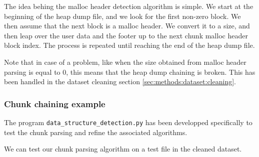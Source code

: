    The idea behing the malloc header detection algorithm is simple. We start at the beginning of the heap dump file, and we look for the first non-zero block. We then assume that the next block is a malloc header. We convert it to a size, and then leap over the user data and the footer up to the next chunk malloc header block index. The process is repeated until reaching the end of the heap dump file.

    Note that in case of a problem, like when the size obtained from malloc header parsing is equal to 0, this means that the heap dump chaining is broken. This has been handled in the dataset cleaning section \ref{sec:methods:dataset:cleaning}. 

    \subsubsection{Chunk chaining example}
    The program \texttt{data\_structure\_detection.py} has been developped specifically to test the chunk parsing and refine the associated algorithms.

    We can test our chunk parsing algorithm on a test file in the cleaned dataset.

